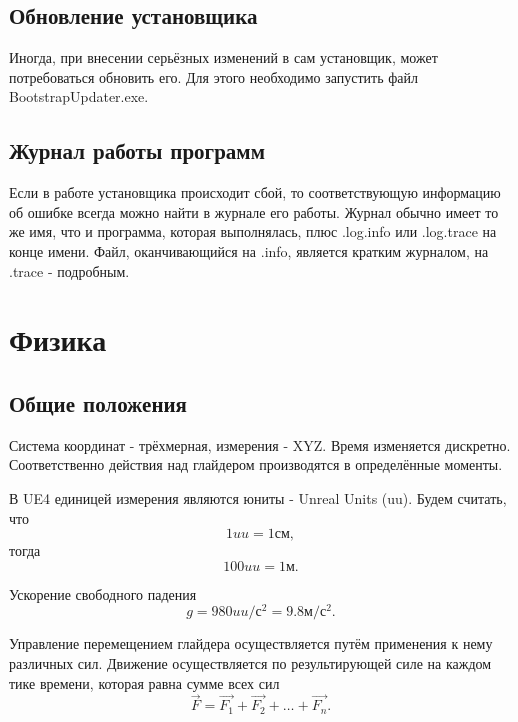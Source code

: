 \documentclass[a4paper,12pt]{report}
\newcommand{\ue}{UE4\xspace}
\begin{document}
\section{Обновление установщика}

Иногда, при внесении серьёзных изменений в сам установщик, может потребоваться обновить его.
Для этого необходимо запустить файл BootstrapUpdater.exe.

\section{Журнал работы программ}

Если в работе установщика происходит сбой, то соответствующую информацию об ошибке всегда можно найти в журнале его работы.
Журнал обычно имеет то же имя, что и программа, которая выполнялась, плюс .log.info или .log.trace на конце имени.
Файл, оканчивающийся на .info, является кратким журналом, на .trace - подробным.

\chapter{Физика}

\section{Общие положения}

Система координат - трёхмерная, измерения - XYZ. Время изменяется дискретно. Соответственно действия над глайдером производятся в определённые моменты.

В \ue единицей измерения являются юниты - Unreal Units (uu). Будем считать, что
\begin{equation}
1uu = 1см,
\end{equation}
тогда 
\begin{equation}
100uu = 1м.
\end{equation}

Ускорение свободного падения
\begin{equation}
g = 980uu/с^2 = 9.8м/с^2.
\end{equation}

Управление перемещением глайдера осуществляется путём применения к нему различных сил. Движение осуществляется по результирующей силе на каждом тике времени, которая равна сумме всех сил
\begin{equation}
\vec{F} = \vec{F_1} + \vec{F_2} + \dots + \vec{F_n}.
\end{equation}
\end{document}
